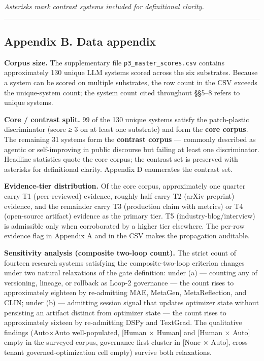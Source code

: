 \documentclass[
]{article}
\begin{document}
\endgroup

\emph{Asterisks mark contrast systems included for definitional
clarity.}

\begin{center}\rule{0.5\linewidth}{0.5pt}\end{center}

\subsection{Appendix B. Data appendix}\label{appendix-b.-data-appendix}

\textbf{Corpus size.} The supplementary file
\texttt{p3\_master\_scores.csv} contains approximately 130 unique LLM
systems scored across the six substrates. Because a system can be scored
on multiple substrates, the row count in the CSV exceeds the
unique-system count; the system count cited throughout §§5--8 refers to
unique systems.

\textbf{Core / contrast split.} 99 of the 130 unique systems satisfy the
patch-plastic discriminator (score ≥ 3 on at least one substrate) and
form the \textbf{core corpus}. The remaining 31 systems form the
\textbf{contrast corpus} --- commonly described as agentic or
self-improving in public discourse but failing at least one
discriminator. Headline statistics quote the core corpus; the contrast
set is preserved with asterisks for definitional clarity. Appendix D
enumerates the contrast set.

\textbf{Evidence-tier distribution.} Of the core corpus, approximately
one quarter carry T1 (peer-reviewed) evidence, roughly half carry T2
(arXiv preprint) evidence, and the remainder carry T3 (production claim
with metrics) or T4 (open-source artifact) evidence as the primary tier.
T5 (industry-blog/interview) is admissible only when corroborated by a
higher tier elsewhere. The per-row evidence flag in Appendix A and in
the CSV makes the propagation auditable.

\textbf{Sensitivity analysis (composite two-loop count).} The strict
count of fourteen research systems satisfying the composite-two-loop
criterion changes under two natural relaxations of the gate definition:
under (a) --- counting any of versioning, lineage, or rollback as Loop-2
governance --- the count rises to approximately eighteen by re-admitting
MAE, MetaGen, MetaReflection, and CLIN; under (b) --- admitting session
signal that updates optimizer state without persisting an artifact
distinct from optimizer state --- the count rises to approximately
sixteen by re-admitting DSPy and TextGrad. The qualitative findings
(Auto×Auto well-populated, {[}Human × Human{]} and {[}Human × Auto{]}
empty in the surveyed corpus, governance-first cluster in {[}None ×
Auto{]}, cross-tenant governed-optimization cell empty) survive both
relaxations.
\end{document}
